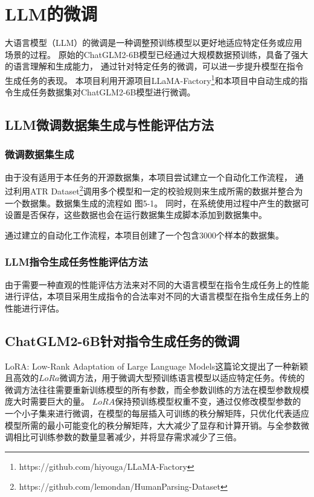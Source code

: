\documentclass[a4paper,AutoFakeBold,oneside,12pt]{book}
\begin{document}
\chapter{LLM的微调} %
大语言模型（LLM）的微调是一种调整预训练模型以更好地适应特定任务或应用场景的过程。
原始的ChatGLM2-6B模型已经通过大规模数据预训练，具备了强大的语言理解和生成能力，
通过针对特定任务的微调，可以进一步提升模型在指令生成任务的表现。
本项目利用开源项目LLaMA-Factory\footnote{https://github.com/hiyouga/LLaMA-Factory}和本项目中自动生成的指令生成任务数据集对ChatGLM2-6B模型进行微调。
\section{LLM微调数据集生成与性能评估方法}
\subsection{微调数据集生成}
由于没有适用于本任务的开源数据集，本项目尝试建立一个自动化工作流程，
通过利用ATR Dataset\footnote{https://github.com/lemondan/HumanParsing-Dataset}调用多个模型和一定的校验规则来生成所需的数据并整合为一个数据集。数据集生成的流程如 图5-1。
同时，在系统使用过程中产生的数据可设置是否保存，这些数据也会在运行数据集生成脚本添加到数据集中。

通过建立的自动化工作流程，本项目创建了一个包含3000个样本的数据集。
\subsection{LLM指令生成任务性能评估方法}
由于需要一种直观的性能评估方法来对不同的大语言模型在指令生成任务上的性能进行评估，本项目采用生成指令的合法率对不同的大语言模型在指令生成任务上的性能进行评估。


\section{ChatGLM2-6B针对指令生成任务的微调}
LoRA: Low-Rank Adaptation of Large Language Models\cite{hu2021lora}这篇论文提出了一种新颖且高效的$LoRa$微调方法，用于微调大型预训练语言模型以适应特定任务。传统的微调方法往往需要重新训练模型的所有参数，而全参数训练的方法在模型参数规模庞大时需要巨大的量。
$LoRA$保持预训练模型权重不变，通过仅修改模型参数的一个小子集来进行微调，在模型的每层插入可训练的秩分解矩阵，只优化代表适应模型所需的最小可能变化的秩分解矩阵，大大减少了显存和计算开销。与全参数微调相比可训练参数的数量显著减少，并将显存需求减少了三倍。
\end{document}
